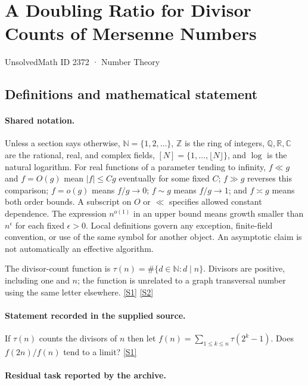 \documentclass[11pt,a4paper]{article}
\newcommand{\N}{\mathbb{N}}
\newcommand{\Z}{\mathbb{Z}}
\newcommand{\Q}{\mathbb{Q}}
\newcommand{\R}{\mathbb{R}}
\newcommand{\C}{\mathbb{C}}
\newcommand{\sref}[2]{\hyperlink{source:#1:#2}{[S#2]}}
\begin{document}

\setcounter{section}{2371}

\section{A Doubling Ratio for Divisor Counts of Mersenne Numbers}\label{2372}

{\small\sffamily UnsolvedMath ID 2372 · Number Theory}

\subsection{Definitions and mathematical statement}

\paragraph{Shared notation.}Unless a section says otherwise, $\N=\{1,2,\ldots\}$,
$\Z$ is the ring of integers, $\Q,\R,\C$ are the rational, real, and complex
fields, $[N]=\{1,\ldots,\lfloor N\rfloor\}$, and $\log$ is the natural
logarithm. For real functions of a parameter tending to infinity,
$f\ll g$ and $f=O(g)$ mean $|f|\leq Cg$ eventually for some fixed $C$;
$f\gg g$ reverses this comparison; $f=o(g)$ means $f/g\to0$;
$f\sim g$ means $f/g\to1$; and $f\asymp g$ means both order bounds.
A subscript on $O$ or $\ll$ specifies allowed constant dependence.
The expression $n^{o(1)}$ in an upper bound means growth smaller than
$n^\epsilon$ for each fixed $\epsilon>0$. Local definitions govern any
exception, finite-field convention, or use of the same symbol for another
object. An asymptotic claim is not automatically an effective algorithm.



The divisor-count function is $\tau(n)=\#\{d\in\N:d\mid n\}$. Divisors are positive, including one and $n$; the function is unrelated to a graph transversal number using the same letter elsewhere. \sref{2372}{1} \sref{2372}{2}

\paragraph{Statement recorded in the supplied source.}
If $\tau(n)$ counts the divisors of $n$ then let $ f(n)=\sum_{1\leq k\leq n}\tau(2^k-1). $ Does $f(2n)/f(n)$ tend to a limit? \sref{2372}{1}

\paragraph{Residual task reported by the archive.}
\end{document}

